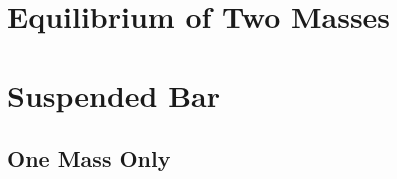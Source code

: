 \documentclass{article}
\begin{document}
\subsection{} %



\subsection{} %

\section{Equilibrium of Two Masses}

\subsection{} %



\subsection{} %



\subsection{} %



\subsection{} %




\section{Suspended Bar}

\subsection{One Mass Only}

\subsubsection{} %



\subsubsection{} %
\end{document}
